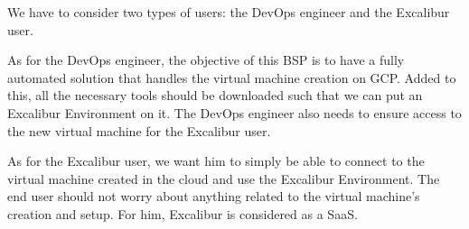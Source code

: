 We have to consider two types of users: the DevOps engineer and the
Excalibur user.

As for the DevOps engineer, the objective of this BSP is to have a
fully automated solution that handles the virtual machine creation on
GCP.  Added to this, all the necessary tools should be downloaded such
that we can put an Excalibur Environment on it. The DevOps engineer
also needs to ensure access to the new virtual machine for the
Excalibur user.

As for the Excalibur user, we want him to simply be able to connect to
the virtual machine created in the cloud and use the Excalibur
Environment. The end user should not worry about anything related to
the virtual machine's creation and setup. For him, Excalibur is
considered as a SaaS.

